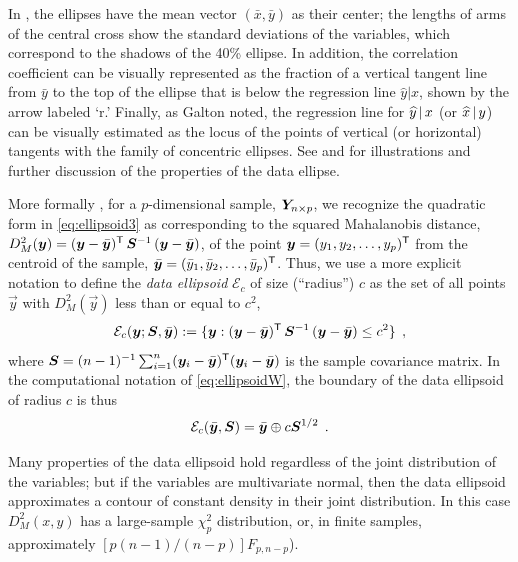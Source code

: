 In , the ellipses have the mean vector
$(\bar{x}, \bar{y})$ as their center;  the lengths of arms of the
central cross show the standard deviations of the variables, which
correspond to the shadows of the 40\% ellipse.  In
addition, the correlation coefficient can be visually represented as
the fraction of a vertical tangent line from $\bar{y}$ to the top of
the ellipse that is below the regression line $\widehat{y} | x$, shown
by the arrow labeled `r.' Finally, as Galton noted, the regression line
for $\widehat{y} \, | \, x$ (or $\widehat{x} \, | \, y$)
can be visually estimated as the locus of the points of vertical
(or horizontal) tangents with the family of concentric ellipses.
See \citet[Figs.~5.1--5.2]{Monette:90} and
\citet[p.~183]{Friendly:91} for illustrations and further discussion
of the properties of the data ellipse.

More formally \citep{Dempster:69,Monette:90}, for a $p$-dimensional
sample, $\bm{Y}_{n \times p}$,
we recognize the quadratic form in \eqref{eq:ellipsoid3}
as corresponding to the squared Mahalanobis distance,
$D^2_M (\bm{y}) = (\bm{y} - \bar{\bm{y}})^\mathsf{T} \, \bm{S}^{-1} \, (\bm{y} - \bar{\bm{y}})$,
of the point
$\bm{y} = (y_1, y_2, \dots , y_p)^\mathsf{T}$
from the centroid of the sample,
$\bar{\bm{y}} = (\bar{y}_1, \bar{y}_2, \dots , \bar{y}_p)^\mathsf{T}$.
Thus, we use a more explicit notation to
define the \emph{data ellipsoid} $\mathcal{E}_c$ of size (``radius'') $c$
as the set of all points $\vec{y}$ with $D^2_M (\vec{y})$ less than or
equal to $c^2$,
\begin{equation}\label{eq:dsq}
\mathcal{E}_c ( \bm{y}; \bm{S},  \bar{\bm{y}} )
:= \{ \bm{y} :
(\bm{y} - \bar{\bm{y}})^\mathsf{T} \, \bm{S}^{-1} \, (\bm{y} - \bar{\bm{y}}) \le c^2 \} \:\: ,
\end{equation}
where
$\bm{S} = ({n-1})^{-1} \sum_{i=1}^n (\bm{y}_i - \bar{\bm{y}})^\mathsf{T} (\bm{y}_i - \bar{\bm{y}})$
is the sample covariance matrix.  In the computational notation of \eqref{eq:ellipsoidW}, the boundary of the
data ellipsoid of radius $c$ is thus
\begin{equation}\label{eq:ellipsoidS}
\mathcal{E}_c(\bar{\bm{y}}, \bm{S}) = \bar{\bm{y}} \oplus c \bm{S}^{1/2} \:\: .
\end{equation}

Many properties of the data ellipsoid hold regardless of the joint distribution of the
variables; but if the variables are multivariate normal, then the data ellipsoid approximates
a contour of constant density in their joint distribution.  In this case $D^2_M (x,y)$
has a large-sample $\chi^2_p$ distribution, or, in finite samples, approximately
$[p (n-1) / (n-p)] F_{p, n-p}$).

